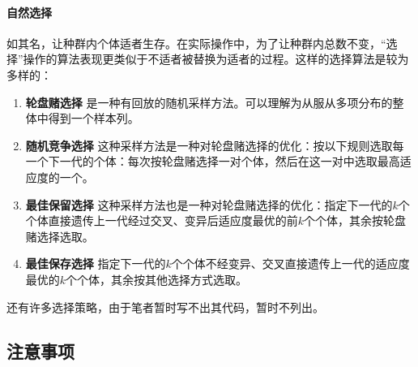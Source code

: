 \documentclass{ctexart}
\begin{document}
\paragraph{自然选择}
如其名，让种群内个体适者生存。在实际操作中，为了让种群内总数不变，“选择”操作的算法表现更类似于不适者被替换为适者的过程。这样的选择算法是较为多样的：
\begin{enumerate}
    \item \textbf{轮盘赌选择} 是一种有回放的随机采样方法。可以理解为从服从多项分布的整体中得到一个样本列。
    \item \textbf{随机竞争选择} 这种采样方法是一种对轮盘赌选择的优化：按以下规则选取每一个下一代的个体：每次按轮盘赌选择一对个体，然后在这一对中选取最高适应度的一个。
    \item \textbf{最佳保留选择} 这种采样方法也是一种对轮盘赌选择的优化：指定下一代的$k$个个体直接遗传上一代经过交叉、变异后适应度最优的前$k$个个体，其余按轮盘赌选择选取。
    \item \textbf{最佳保存选择} 指定下一代的$k$个个体不经变异、交叉直接遗传上一代的适应度最优的$k$个个体，其余按其他选择方式选取。
\end{enumerate}
还有许多选择策略，由于笔者暂时写不出其代码，暂时不列出。

\subsection{注意事项}
\end{document}
